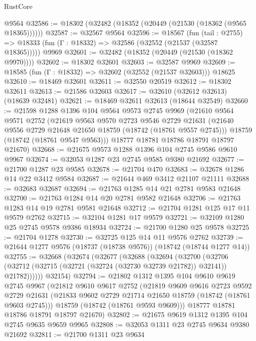 \begin{lexlean}{RustCore}
\begin{coremodule}
    @9564
@32586 := @18302 (@32482 (@18352 (@20449 (@21530 (@18362 (@9565 @18365))))))
@32587 := @32567 @9564
@32596 := @18567
    (fun (tail : @2755) => @18333 (fun (Γ : @18332) => @32586 (@32552 (@21537 (@32587 @18365)))))
    @9969
@32601 := @32482 (@18352 (@20449 (@21530 (@18362 @9970))))
@32602 := @18302 @32601
@32603 := @32587 @9969
@32609 := @18585 (fun (Γ : @18332) => @32602 (@32552 (@21537 @32603))) @18625
@32610 := @18469 @32601
@32611 := @32550 @20519
@32612 := @18302 @32611
@32613 := @21586 @32603
@32617 := @32610 (@32612 @32613) (@18639 @32481)
@32621 := @18469 @32611 @32613 (@18644 @32549)
@32660 := @21598
    @1288
    @1396
    @104
    @9564
    @9573
    @2745
    @9969
    (@21610
      @9564
      @9571
      @2752
      (@21619
        @9563
        @9570
        @2723
        @9546
        @2729
        @21631
        (@21640 @9556 @2729 @21648 @21650 @18759 (@18742 (@18761 @9557 @2745)))
        @18759
        (@18742 (@18761 @9547 @9563)))
      @18777
      @18781
      @18786
      @18791
      @18797
      @21670)
@32668 := @21675 @9573 @1288 @1396 @104 @2745 @9586 @9610 @9967
@32674 := @32053 @1287 @23 @2745 @9585 @9380 @21692
@32677 := @21700 @1287 @23 @9585
@32678 := @21704 @470
@32683 := @32678 @1286 @14 @22 @3412 @9584
@32687 := @21644 @469 @3412 @21107 @21111
@32688 := @32683 @32687
@32694 := @21763 @1285 @14 @21 @2781 @9583 @21648
@32700 := @21763 @1284 @14 @20 @2781 @9582 @21648
@32706 := @21763 @1283 @14 @19 @2781 @9581 @21648
@32712 := @21704 @1281 @125 @17 @11 @9579 @2762
@32715 := @32104 @1281 @17 @9579
@32721 := @32109 @1280 @25 @2745 @9578 @9386 @18934
@32724 := @21700 @1280 @25 @9578
@32725 := @21704 @1278
@32730 := @32725 @125 @14 @11 @9576 @2762
@32739 := @21644 @1277 @9576 (@18737 (@18738 @9576)) (@18742 (@18744 @1277 @14))
@32755 := @32668
    (@32674
      (@32677
        (@32688
          (@32694
            (@32700
              (@32706 (@32712 (@32715 (@32721 (@32724 (@32730 @32739 @21782)) @32141)) @21782))))))
      @32154)
@32794 := @21802
    @1312
    @1395
    @104
    @9610
    @9619
    @2745
    @9967
    (@21812
      @9610
      @9617
      @2752
      (@21819
        @9609
        @9616
        @2723
        @9592
        @2729
        @21631
        (@21833 @9602 @2729 @21714 @21650 @18759 (@18742 (@18761 @9603 @2745)))
        @18759
        (@18742 (@18761 @9593 @9609)))
      @18777
      @18781
      @18786
      @18791
      @18797
      @21670)
@32802 := @21675 @9619 @1312 @1395 @104 @2745 @9635 @9659 @9965
@32808 := @32053 @1311 @23 @2745 @9634 @9380 @21692
@32811 := @21700 @1311 @23 @9634

\end{coremodule}
\end{lexlean}
